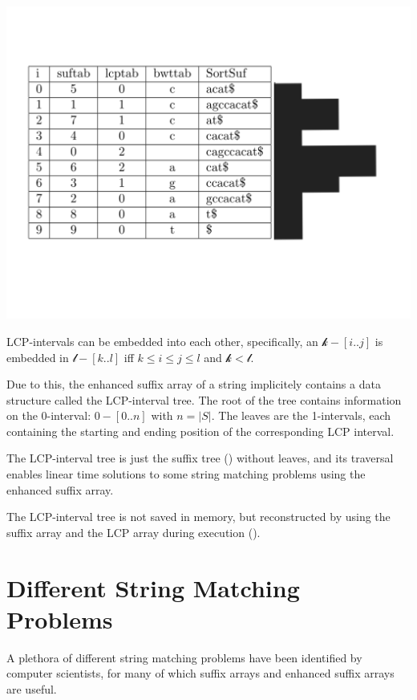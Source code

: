 \documentclass[a4paper,10pt]{article}
\begin{document}
\includegraphics[width=\textwidth]{local_maxima.png}

LCP-intervals can be embedded into each other, specifically, an
$\mathcal{k}-[i..j]$ is embedded in $\mathcal{l}-[k..l]$ iff $k \le i
\le j \le l$ and $\mathcal{k}<\mathcal{l}$.

Due to this, the enhanced suffix array of a string implicitely contains
a data structure called the LCP-interval tree. The root of the tree
contains information on the 0-interval: $0-[0..n]$ with $n=|S|$. The
leaves are the 1-intervals, each containing the starting and ending
position of the corresponding LCP interval.

The LCP-interval tree is just the suffix tree (\citealt{weiner1973linear})
without leaves, and its traversal enables linear time solutions to some
string matching problems using the enhanced suffix array.

The LCP-interval tree is not saved in memory, but reconstructed
by using the suffix array and the LCP array during execution
(\citealt{abouelhoda2002enhanced}).


\section*{Different String Matching Problems}

A plethora of different string matching problems have been identified
by computer scientists, for many of which suffix arrays and enhanced
suffix arrays are useful.
\end{document}
